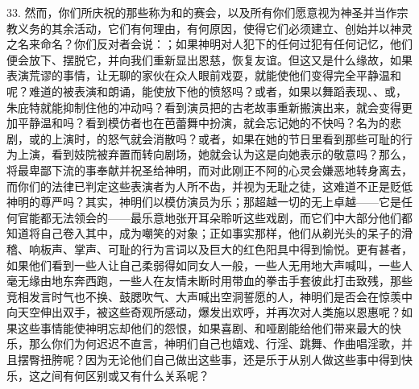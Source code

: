 33. 然而，你们所庆祝的那些称为和的赛会，以及所有你们愿意视为神圣并当作宗教义务的其余活动，它们有何理由，有何原因，使得它们必须建立、创始并以神灵之名来命名？你们反对者会说：；如果神明对人犯下的任何过犯有任何记忆，他们便会放下、摆脱它，并向我们重新显出恩慈，恢复友谊。但这又是什么缘故，如果表演荒谬的事情，让无聊的家伙在众人眼前戏耍，就能使他们变得完全平静温和呢？难道的被表演和朗诵，能使放下他的愤怒吗？或者，如果以舞蹈表现、、或，朱庇特就能抑制住他的冲动吗？看到演员把的古老故事重新搬演出来，就会变得更加平静温和吗？看到模仿者也在芭蕾舞中扮演，就会忘记她的不快吗？名为的悲剧，或的上演时，的怒气就会消散吗？或者，如果在她的节日里看到那些可耻的行为上演，看到妓院被弃置而转向剧场，她就会认为这是向她表示的敬意吗？那么，将最卑鄙下流的事奉献并祝圣给神明，而对此刚正不阿的心灵会嫌恶地转身离去，而你们的法律已判定这些表演者为人所不齿，并视为无耻之徒，这难道不正是贬低神明的尊严吗？其实，神明们以模仿演员为乐；那超越一切的无上卓越——它是任何官能都无法领会的——最乐意地张开耳朵聆听这些戏剧，而它们中大部分他们都知道将自己卷入其中，成为嘲笑的对象；正如事实那样，他们从剃光头的呆子的滑稽、响板声、掌声、可耻的行为言词以及巨大的红色阳具中得到愉悦。更有甚者，如果他们看到一些人让自己柔弱得如同女人一般，一些人无用地大声喊叫，一些人毫无缘由地东奔西跑，一些人在友情未断时用带血的拳击手套彼此打击致残，那些竞相发言时气也不换、鼓腮吹气、大声喊出空洞誓愿的人，神明们是否会在惊羡中向天空伸出双手，被这些奇观所感动，爆发出欢呼，并再次对人类施以恩惠呢？如果这些事情能使神明忘却他们的怨恨，如果喜剧、和哑剧能给他们带来最大的快乐，那么你们为何迟迟不直言，神明们自己也嬉戏、行淫、跳舞、作曲唱淫歌，并且摆臀扭胯呢？因为无论他们自己做出这些事，还是乐于从别人做这些事中得到快乐，这之间有何区别或又有什么关系呢？\par

